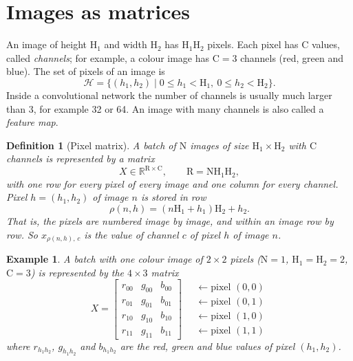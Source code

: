 \documentclass[twoside,11pt]{article}
\newtheorem{example}{Example}
\newtheorem{definition}{Definition}
\newcommand{\const}[1]{\ensuremath{\mathrm{#1}}} %
\newcommand{\set}[1]{\ensuremath{\{ #1 \} }}     %
\newcommand{\Reals}{\mathbb{R}}
\newcommand{\Hin}{\const{H}}         %
\newcommand{\pix}{\mathcal{H}}       %
\begin{document}
\section{Images as matrices} \label{section:images}

An image of height $\Hin_1$ and width $\Hin_2$ has $\Hin_1 \Hin_2$ pixels.
Each pixel has $\const{C}$ values, called \emph{channels}; for example, a colour image has $\const{C} = 3$ channels (red, green and blue).
The set of pixels of an image is
\[
\pix = \set{ (h_1, h_2) \mid 0 \leq h_1 < \Hin_1,\ 0 \leq h_2 < \Hin_2 }.
\]
Inside a convolutional network the number of channels is usually much larger than 3, for example 32 or 64.
An image with many channels is also called a \emph{feature map}.

\begin{definition}[Pixel matrix] \label{def:pixel-matrix}
A batch of $\const{N}$ images of size $\Hin_1 \times \Hin_2$ with $\const{C}$ channels is represented by a matrix
\[
X \in \Reals^{\const{R} \times \const{C}}, \qquad \const{R} = \const{N} \Hin_1 \Hin_2,
\]
with one row for every pixel of every image and one column for every channel.
Pixel $h = (h_1, h_2)$ of image $n$ is stored in row
\[
\rho(n, h) = (n \Hin_1 + h_1) \Hin_2 + h_2.
\]
That is, the pixels are numbered image by image, and within an image row by row.
So $x_{\rho(n,h),\,c}$ is the value of channel $c$ of pixel $h$ of image $n$.
\end{definition}

\begin{example} \label{example:pixel-matrix}
A batch with one colour image of $2 \times 2$ pixels ($\const{N} = 1$, $\Hin_1 = \Hin_2 = 2$, $\const{C} = 3$) is represented by the $4 \times 3$ matrix
\[
X =
\begin{bmatrix}
r_{00} & g_{00} & b_{00} \\
r_{01} & g_{01} & b_{01} \\
r_{10} & g_{10} & b_{10} \\
r_{11} & g_{11} & b_{11}
\end{bmatrix}
\quad
\begin{matrix}
\leftarrow \text{pixel } (0,0) \\
\leftarrow \text{pixel } (0,1) \\
\leftarrow \text{pixel } (1,0) \\
\leftarrow \text{pixel } (1,1)
\end{matrix}
\]
where $r_{h_1 h_2}$, $g_{h_1 h_2}$ and $b_{h_1 h_2}$ are the red, green and blue values of pixel $(h_1, h_2)$.
\end{example}
\end{document}
